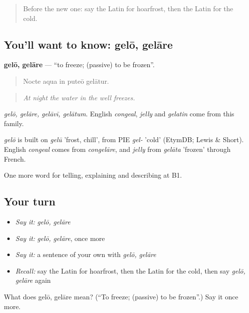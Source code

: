 \begin{quote}
Before the new one: say the Latin for hoarfrost, then the Latin for the cold.
\end{quote}

\subsection*{You'll want to know: gelō, gelāre}
\textbf{gelō, gelāre} — \textquotedblleft{}to freeze; (passive) to be frozen\textquotedblright{}.

\begin{quote}
Nocte aqua in puteō gelātur.
\end{quote}

\begin{quote}
\emph{At night the water in the well freezes.}
\end{quote}

\emph{gelō, gelāre, gelāvī, gelātum}. English \emph{congeal}, \emph{jelly} and \emph{gelatin} come from this family.

\begin{cousinweb}
\emph{gelō} is built on \emph{gelū} 'frost, chill', from PIE \emph{gel-} 'cold' (EtymDB; Lewis \& Short). English \emph{congeal} comes from \emph{congelāre}, and \emph{jelly} from \emph{gelāta} 'frozen' through French.
\end{cousinweb}

\begin{grammarlens}[title={What you've built}]
One more word for telling, explaining and describing at B1.
\end{grammarlens}

\subsection*{Your turn}
\begin{itemize}
\raggedright
  \item \emph{Say it:} \emph{gelō, gelāre}
  \item \emph{Say it:} \emph{gelō, gelāre}, once more
  \item \emph{Say it:} a sentence of your own with \emph{gelō, gelāre}
  \item \emph{Recall:} say the Latin for hoarfrost, then the Latin for the cold, then say \emph{gelō, gelāre} again
\end{itemize}

\begin{tcolorbox}[breakable,colback=teal!4,colframe=teal!35!black,title={Before you move on}]
What does gelō, gelāre mean? (\textquotedblleft{}To freeze; (passive) to be frozen\textquotedblright{}.) Say it once more.
\end{tcolorbox}
